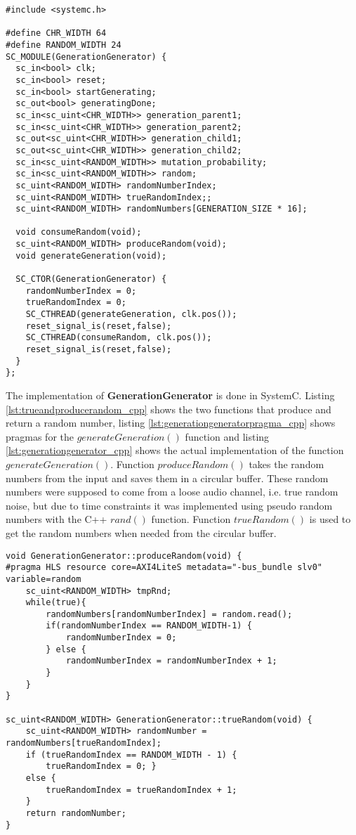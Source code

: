 \begin{lstlisting}[style=customc++, caption={GenerationGenerator.h},label={lst:generationgenerator_h}]
#include <systemc.h>

#define CHR_WIDTH 64
#define RANDOM_WIDTH 24
SC_MODULE(GenerationGenerator) {
  sc_in<bool> clk;
  sc_in<bool> reset;
  sc_in<bool> startGenerating;
  sc_out<bool> generatingDone;
  sc_in<sc_uint<CHR_WIDTH>> generation_parent1;
  sc_in<sc_uint<CHR_WIDTH>> generation_parent2;
  sc_out<sc_uint<CHR_WIDTH>> generation_child1;
  sc_out<sc_uint<CHR_WIDTH>> generation_child2;
  sc_in<sc_uint<RANDOM_WIDTH>> mutation_probability;
  sc_in<sc_uint<RANDOM_WIDTH>> random;
  sc_uint<RANDOM_WIDTH> randomNumberIndex;
  sc_uint<RANDOM_WIDTH> trueRandomIndex;;
  sc_uint<RANDOM_WIDTH> randomNumbers[GENERATION_SIZE * 16];

  void consumeRandom(void);
  sc_uint<RANDOM_WIDTH> produceRandom(void);
  void generateGeneration(void);
  
  SC_CTOR(GenerationGenerator) {
    randomNumberIndex = 0;
    trueRandomIndex = 0;
    SC_CTHREAD(generateGeneration, clk.pos());
    reset_signal_is(reset,false);
    SC_CTHREAD(consumeRandom, clk.pos());
    reset_signal_is(reset,false);
  }
};
\end{lstlisting}

The implementation of \textbf{GenerationGenerator} is done in SystemC. Listing \ref{lst:trueandproducerandom_cpp} shows the two functions that produce and return a random number, listing \ref{lst:generationgeneratorpragma_cpp} shows pragmas for the $generateGeneration()$ function and listing \ref{lst:generationgenerator_cpp} shows the actual implementation of the function $generateGeneration()$. Function $produceRandom()$ takes the random numbers from the input and saves them in a circular buffer. These random numbers were supposed to come from a loose audio channel, i.e. true random noise, but due to time constraints it was implemented using pseudo random numbers with the C++ $rand()$ function. Function $trueRandom()$ is used to get the random numbers when needed from the circular buffer.

\begin{lstlisting}[style=customc++,caption=The two methods for producing and accessing a random number., label={lst:trueandproducerandom_cpp}]
void GenerationGenerator::produceRandom(void) {
#pragma HLS resource core=AXI4LiteS metadata="-bus_bundle slv0" variable=random
	sc_uint<RANDOM_WIDTH> tmpRnd;
	while(true){
		randomNumbers[randomNumberIndex] = random.read();
		if(randomNumberIndex == RANDOM_WIDTH-1) {
			randomNumberIndex = 0;
		} else {
			randomNumberIndex = randomNumberIndex + 1;
		}
	}
}

sc_uint<RANDOM_WIDTH> GenerationGenerator::trueRandom(void) {
	sc_uint<RANDOM_WIDTH> randomNumber = randomNumbers[trueRandomIndex];
	if (trueRandomIndex == RANDOM_WIDTH - 1) {
		trueRandomIndex = 0; }
	else {
		trueRandomIndex = trueRandomIndex + 1;
	}
	return randomNumber;
}
\end{lstlisting}  

